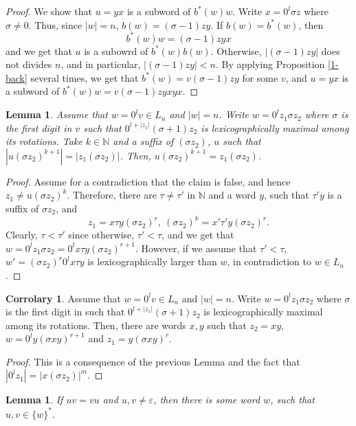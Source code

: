 \documentclass{article}
\newtheorem{lemma}[theorem]{Lemma}
\theoremstyle{definition}
\newtheorem{corrolary}[theorem]{Corrolary}
\newcommand{\N}{{\mathbb{N}}}
\begin{document}
\begin{proof}
We show that $u=yx$ is a subword of $b^*(w)w$. Write $x=0^l\sigma z$ where $\sigma\neq 0$. Thus, since $|w|=n$, $b(w)=(\sigma-1)zy$. If $b(w)=b^*(w)$, then 
$$b^*(w)w=(\sigma-1)zyx$$
and we get that $u$ is a subowrd of $b^*(w)b(w)$. Otherwise, $|(\sigma-1)zy|$ does not divides $n$, and in particular, $|(\sigma-1)zy|<n$. By applying Proposition \ref{1-back} several times, we get that $b^*(w)=v(\sigma-1)zy$ for some $v$, and $u=yx$ is a subword of $b^*(w)w=v(\sigma-1)zyxyx$.
\end{proof}

\begin{lemma}
\label{z1}
Assume that $w=0^lv\in L_n$ and $|w|=n$. Write $w=0^lz_1\sigma z_2$ where $\sigma$ is the first digit in $v$ such that $0^{l+|z_1|}(\sigma+1)z_2$ is lexicographically maximal among its rotations. Take $k\in \N$ and a suffix of $(\sigma z_2)$, $u$ such that $|u(\sigma z_2)^{k+1}|=|z_1(\sigma z_2)|$. Then, $u(\sigma z_2)^{k+1}= z_1(\sigma z_2)$.
\end{lemma}

\begin{proof}
Assume for a contradiction that the claim is false, and hence $z_1\neq u(\sigma z_2)^k$. Therefore, there are $\tau\neq \tau'$ in $\N$ and a word $y$, such that $\tau'y$ is a suffix of $\sigma z_2$, and 
$$z_1=x\tau y(\sigma z_2)^r, \ (\sigma z_2)^k= x'\tau' y(\sigma z_2)^r.$$
Clearly, $\tau<\tau'$ since otherwise, $\tau'<\tau$, and we get that 
$w=0^lz_1\sigma z_2=0^lx\tau y (\sigma z_2)^{r+1}$. However, if we assume that $\tau'<\tau$, $w'=(\sigma z_2)^r0^lx\tau y$ is lexicographically larger than $w$, in contradiction to $w\in L_n$.
\end{proof}

\begin{corrolary}
\label{z1-suffix}
Assume that $w=0^lv\in L_n$ and $|w|=n$. Write $w=0^lz_1\sigma z_2$ where $\sigma$ is the first digit in such that $0^{l+|z_1|}(\sigma+1)z_2$ is lexicographically maximal among its rotations. Then, there are words $x,y$ such that $z_2=xy$, $w=0^ly(\sigma xy)^{r+1}$ and $z_1=y(\sigma xy)^r$.
\end{corrolary}
\begin{proof}
 This is a consequence of the previous Lemma and the fact that $|0^lz_1|=|x(\sigma z_2)|^m$.
\end{proof}

\begin{lemma}
\label{concatenation}
If $uv=vu$ and $u,v\neq\varepsilon$, then there is some word $w$, such that $u,v\in\{w\}^*$.
\end{lemma}
\end{document}
